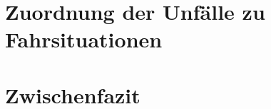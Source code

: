 


\section{Zuordnung der Unfälle zu Fahrsituationen}\label{section:Zuordnung der Unfälle zu Fahrsituationen}






\section{Zwischenfazit}


